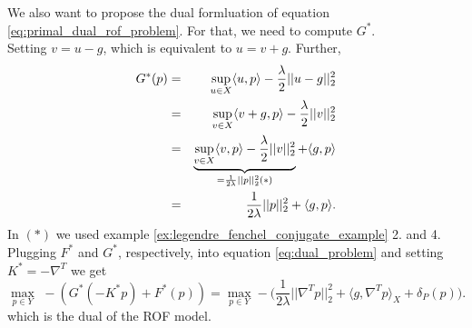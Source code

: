         We also want to propose the dual formluation of equation \ref{eq:primal_dual_rof_problem}. For that, we need to compute $G^{\ast}$. \\
        Setting $v = u - g$, which is equivalent to $u = v + g$. Further,
            \begin{eqnarray}
                G^{\ast}(p) &=& \sup_{u \in X} \langle u, p \rangle - \frac{\lambda}{2} ||u - g||_{2}^{2} \notag \\
                &=& \sup_{v \in X} \langle v + g, p \rangle - \frac{\lambda}{2} ||v||_{2}^{2} \notag \\
                &=& \underbrace{\sup_{v \in X} \langle v, p \rangle - \frac{\lambda}{2} ||v||_{2}^{2}}_{= \frac{1}{2\lambda} ||p||_{2}^{2} (\ast)} + \langle g, p \rangle \notag \\
                &=& \frac{1}{2\lambda} ||p||_{2}^{2} + \langle g, p \rangle. \notag
            \end{eqnarray}
        In $(\ast)$ we used example \ref{ex:legendre_fenchel_conjugate_example} 2. and 4.
        Plugging $F^{\ast}$ and $G^{\ast}$, respectively, into equation \ref{eq:dual_problem} and setting $K^{\ast} = -\nabla^{T}$ we get
            \begin{equation}
                \max_{p \in Y}\,\, -(G^{\ast}(-K^{\ast}p) + F^{\ast}(p)) = \max_{p \in Y} - \bigg( \frac{1}{2\lambda} ||\nabla^{T}p||^{2}_{2} + \langle g, \nabla^{T}p \rangle_{X} + \delta_{P}(p) \bigg).
            \label{eq:dual_rof_problem}
            \end{equation}
        which is the dual of the ROF model.

